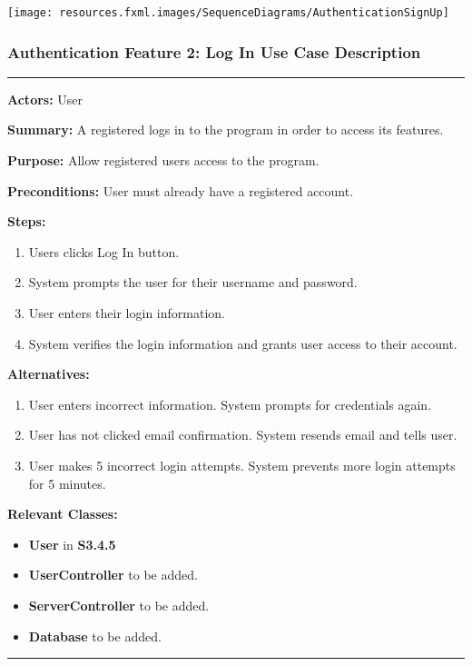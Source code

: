 \documentclass[twoside,letterpaper]{article}
\begin{document}
\bigskip

\texttt{[image: resources.fxml.images/SequenceDiagrams/AuthenticationSignUp]}

\newpage

\subsubsection[Authentication Feature 2: Log In Use Case Description]{\rmfamily\bfseries\color{black}
	Authentication Feature 2: Log In Use Case Description}
	\label{a:uc2}
\hypertarget{RefHeading22059017292}{}

\hrule
\vspace{8pt}
\noindent\textbf{Actors:} User \newline

\noindent\textbf{Summary:} A registered logs in to the program in order to access its features.  \newline

\noindent\textbf{Purpose:} Allow registered users access to the program.  \newline

\noindent\textbf{Preconditions:} User must already have a registered account.  \newline

\noindent\textbf{Steps:}
\begin{enumerate}
	\item Users clicks Log In button.
	\item System prompts the user for their username and password.
	\item User enters their login information.
	\item System verifies the login information and grants user access to their account.
\end{enumerate}
\noindent\textbf{Alternatives:}
	\begin{enumerate}
		\item User enters incorrect information. System prompts for credentials again.
		\item User has not clicked email confirmation. System resends email and tells user.
		\item User makes 5 incorrect login attempts. System prevents more login attempts for 5 minutes.
	\end{enumerate}

\noindent\textbf{Relevant Classes:}
\begin{itemize}
	\item \textbf{User} in \textbf{S3.4.5}
	\item \textbf{UserController} to be added.
	\item \textbf{ServerController} to be added.
	\item \textbf{Database} to be added.
\end{itemize}
\vspace{8pt}
\hrule
\newpage
\end{document}
